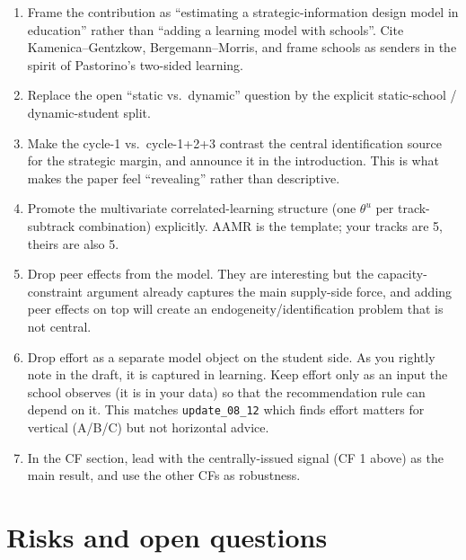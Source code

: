 \documentclass{article}
\begin{document}
\begin{enumerate}[leftmargin=*]
  \item Frame the contribution as ``estimating a strategic-information
  design model in education'' rather than ``adding a learning model with
  schools''. Cite Kamenica--Gentzkow, Bergemann--Morris, and frame
  schools as senders in the spirit of Pastorino's two-sided learning.

  \item Replace the open ``static vs.\ dynamic'' question by the explicit
  static-school / dynamic-student split.

  \item Make the cycle-1 vs.\ cycle-1+2+3 contrast the central
  identification source for the strategic margin, and announce it in the
  introduction. This is what makes the paper feel ``revealing'' rather
  than descriptive.

  \item Promote the multivariate correlated-learning structure (one
  $\theta^u$ per track-subtrack combination) explicitly. AAMR is the
  template; your tracks are 5, theirs are also 5.

  \item Drop peer effects from the model.  They are interesting but the
  capacity-constraint argument already captures the main supply-side
  force, and adding peer effects on top will create an
  endogeneity/identification problem that is not central.

  \item Drop effort as a separate model object on the student side. As you
  rightly note in the draft, it is captured in learning. Keep effort only
  as an input the school observes (it is in your data) so that the
  recommendation rule can depend on it. This matches \texttt{update\_08\_12}
  which finds effort matters for vertical (A/B/C) but not horizontal advice.

  \item In the CF section, lead with the centrally-issued signal (CF 1
  above) as the main result, and use the other CFs as robustness.
\end{enumerate}

\section{Risks and open questions}
\end{document}
